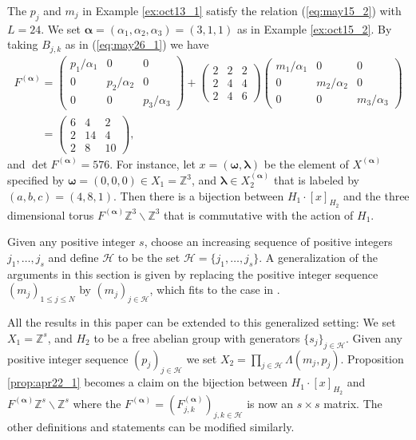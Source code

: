 \documentclass[11pt]{article}
\newcommand{\Z}{{\mathbb Z}}
\newcommand\bom{\boldsymbol{\omega}}
\newcommand\bol{\boldsymbol{\lambda}}
\newcommand\boa{\boldsymbol{\alpha}}
\renewcommand{\H}{{\mathcal H}}
\begin{document}
\begin{example}\label{ex:oct15_4}
The $p_j$ and $m_j$ in Example \ref{ex:oct13_1} satisfy the relation (\ref{eq:may15_2}) with $L=24$.
We set $\boa = (\alpha_1, \alpha_2, \alpha_3) = (3,1,1)$ as in Example \ref{ex:oct15_2}.
By taking $B_{j,k}$ as in (\ref{eq:may26_1}) we have
\begin{gather*}
F^{(\boa)}  =
\begin{pmatrix}
p_1/\alpha_1  & 0 & 0 \\
0 &  p_2/\alpha_2  & 0 \\
0 & 0 &   p_3/\alpha_3
\end{pmatrix}
+
\begin{pmatrix}
2 & 2 & 2 \\
2 & 4 & 4 \\
2 & 4 & 6
\end{pmatrix}
\begin{pmatrix}
m_1/\alpha_1   & 0 & 0 \\
0 &  m_2/\alpha_2  & 0 \\
0 & 0 &   m_3/\alpha_3
\end{pmatrix}\\
\phantom{F^{(\boa)}}{}
 =
\begin{pmatrix}
6 & 4 & 2 \\
2 & 14 & 4 \\
2 & 8 & 10
\end{pmatrix}
,
\end{gather*}
and $\det F^{(\boa)} = 576$.
For instance, let $x = (\bom, \bol)$ be the element of $X^{(\boa)}$ specif\/ied by
$\bom = (0,0,0) \in X_1 = \Z^3$, and
$\bol \in X_2^{(\boa)}$ that is labeled by $(a,b,c) = (4,8,1)$.
Then there is a bijection between $H_1 \cdot [x]_{H_2}$ and
the three dimensional torus $F^{(\boa)} \Z^3 \backslash \Z^3$ that is commutative with the action of $H_1$.
\end{example}

%
\begin{remark}\label{rem:mar12_1}
Given any positive integer $s$, choose an increasing sequence of positive integers $j_1, \ldots ,j_s$
and def\/ine $\H$ to be the set $\H=\{j_1,\ldots,j_s\}$.
{A generalization of the arguments in this section is given by} replacing the positive integer sequence $(m_j)_{1 \leq j \leq N}$ by
$(m_j)_{j \in \H}$, which f\/its to the case in \cite{KTT}.

All the results in this paper can be extended to this generalized setting:
We set $X_1 = \Z^s$, and
$H_2$ to be a free abelian group with generators $\{ s_j \}_{j \in \H}$.
Given any {positive} integer sequence $(p_j)_{j \in \H}$
we set $X_2 = \prod_{j \in \H} \Lambda (m_j,p_j)$.
Proposition \ref{prop:apr22_1} becomes a claim on the bijection between
$H_1 \cdot [x]_{H_2}$ and $F^{(\boa)} \Z^s \backslash \Z^s$ where
the $F^{(\boa)}= (F^{(\boa)}_{j,k})_{j,k \in \H}$ is now an $s \times s$ matrix.
%
The other def\/initions and statements can be modif\/ied similarly.

\end{remark}
\end{document}
